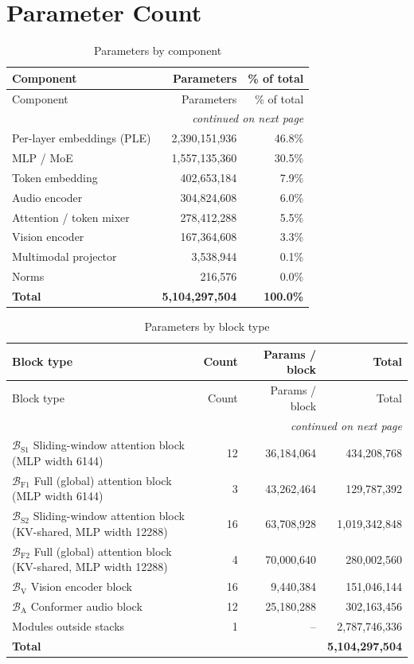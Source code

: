 \documentclass[10pt,a4paper]{article}
\theoremstyle{definition}
\begin{document}
\section{Parameter Count}
\begin{longtable}{lrr}
\caption{Parameters by component}\\
\toprule
Component & Parameters & \% of total \\
\midrule
\endfirsthead
\toprule
Component & Parameters & \% of total \\
\midrule
\endhead
\midrule \multicolumn{3}{r}{\textit{continued on next page}} \\
\endfoot
\bottomrule
\endlastfoot
Per-layer embeddings (PLE) & 2,390,151,936 & 46.8\% \\
MLP / MoE & 1,557,135,360 & 30.5\% \\
Token embedding & 402,653,184 & 7.9\% \\
Audio encoder & 304,824,608 & 6.0\% \\
Attention / token mixer & 278,412,288 & 5.5\% \\
Vision encoder & 167,364,608 & 3.3\% \\
Multimodal projector & 3,538,944 & 0.1\% \\
Norms & 216,576 & 0.0\% \\
\midrule \textbf{Total} & \textbf{5,104,297,504} & \textbf{100.0\%} \\
\end{longtable}
\begin{longtable}{p{8cm}rrr}
\caption{Parameters by block type}\\
\toprule
Block type & Count & Params / block & Total \\
\midrule
\endfirsthead
\toprule
Block type & Count & Params / block & Total \\
\midrule
\endhead
\midrule \multicolumn{4}{r}{\textit{continued on next page}} \\
\endfoot
\bottomrule
\endlastfoot
$\mathcal{B}_{\mathrm{S1}}$ Sliding-window attention block (MLP width 6144) & 12 & 36,184,064 & 434,208,768 \\
$\mathcal{B}_{\mathrm{F1}}$ Full (global) attention block (MLP width 6144) & 3 & 43,262,464 & 129,787,392 \\
$\mathcal{B}_{\mathrm{S2}}$ Sliding-window attention block (KV-shared, MLP width 12288) & 16 & 63,708,928 & 1,019,342,848 \\
$\mathcal{B}_{\mathrm{F2}}$ Full (global) attention block (KV-shared, MLP width 12288) & 4 & 70,000,640 & 280,002,560 \\
$\mathcal{B}_{\mathrm{V}}$ Vision encoder block & 16 & 9,440,384 & 151,046,144 \\
$\mathcal{B}_{\mathrm{A}}$ Conformer audio block & 12 & 25,180,288 & 302,163,456 \\
Modules outside stacks & 1 & -- & 2,787,746,336 \\
\midrule \textbf{Total} & & & \textbf{5,104,297,504} \\
\end{longtable}
\end{document}
